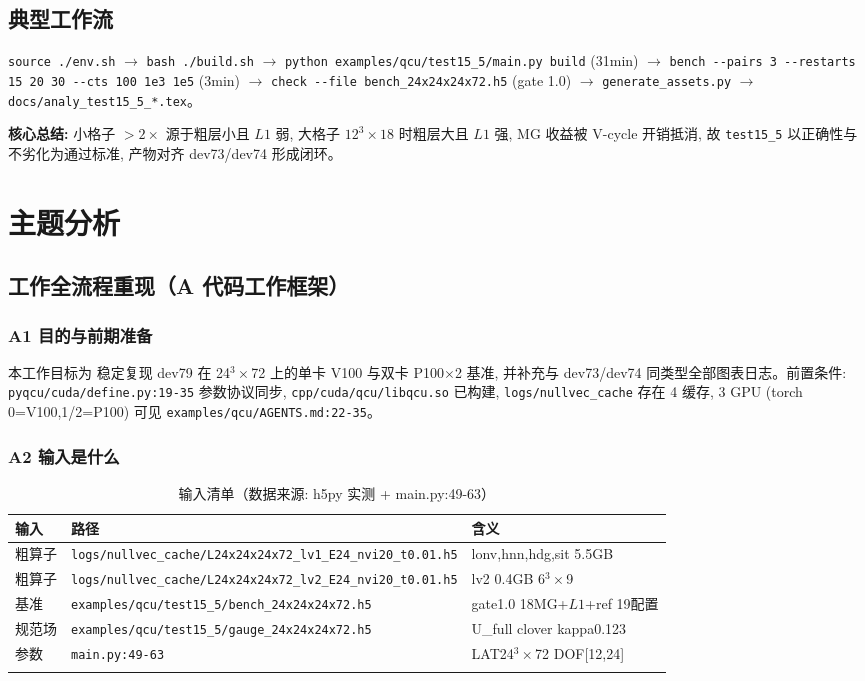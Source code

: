 \documentclass[UTF8]{ctexart}
\begin{document}
\subsection{典型工作流}
\texttt{\nolinkurl{source ./env.sh}} $\to$ \texttt{\nolinkurl{bash ./build.sh}} $\to$ \texttt{\nolinkurl{python examples/qcu/test15_5/main.py build}} (31min) $\to$ \texttt{\nolinkurl{bench --pairs 3 --restarts 15 20 30 --cts 100 1e3 1e5}} (3min) $\to$ \texttt{\nolinkurl{check --file bench_24x24x24x72.h5}} (gate 1.0) $\to$ \texttt{\nolinkurl{generate_assets.py}} $\to$ \texttt{\nolinkurl{docs/analy_test15_5_*.tex}}。

\begin{ideabox}
\textbf{核心总结:} 小格子 $>2\times$ 源于粗层小且 $L1$ 弱, 大格子 $12^3\times18$ 时粗层大且 $L1$ 强, MG 收益被 V-cycle 开销抵消, 故 \texttt{\nolinkurl{test15_5}} 以正确性与不劣化为通过标准, 产物对齐 dev73/dev74 形成闭环。
\end{ideabox}

\section{主题分析}
\subsection{工作全流程重现（A 代码工作框架）}

\subsubsection{A1 目的与前期准备}
本工作目标为 \textcolor{struct}{稳定复现 dev79 在 24$^3\times$72 上的单卡 V100 与双卡 P100$\times$2 基准, 并补充与 dev73/dev74 同类型全部图表日志}。前置条件: \texttt{\nolinkurl{pyqcu/cuda/define.py:19-35}} 参数协议同步, \texttt{\nolinkurl{cpp/cuda/qcu/libqcu.so}} 已构建, \texttt{\nolinkurl{logs/nullvec_cache}} 存在 4 缓存, 3 GPU (torch 0=V100,1/2=P100) 可见 \textcolor{evidence}{\texttt{\nolinkurl{examples/qcu/AGENTS.md:22-35}}}。

\subsubsection{A2 输入是什么}
\begin{xltabular}{\textwidth}{lXl}
\toprule
输入 & 路径 & 含义 \\
\midrule
\endhead
粗算子 & \texttt{\nolinkurl{logs/nullvec_cache/L24x24x24x72_lv1_E24_nvi20_t0.01.h5}} & lonv,hnn,hdg,sit 5.5GB \\
粗算子 & \texttt{\nolinkurl{logs/nullvec_cache/L24x24x24x72_lv2_E24_nvi20_t0.01.h5}} & lv2 0.4GB 6$^3\times$9 \\
基准 & \texttt{\nolinkurl{examples/qcu/test15_5/bench_24x24x24x72.h5}} & gate1.0 18MG+$L1$+ref 19配置 \\
规范场 & \texttt{\nolinkurl{examples/qcu/test15_5/gauge_24x24x24x72.h5}} & U\_full clover kappa0.123 \\
参数 & \texttt{\nolinkurl{main.py:49-63}} & LAT24$^3\times$72 DOF[12,24] \\
\bottomrule
\caption{输入清单（数据来源: h5py 实测 + main.py:49-63）}
\end{xltabular}
\end{document}

